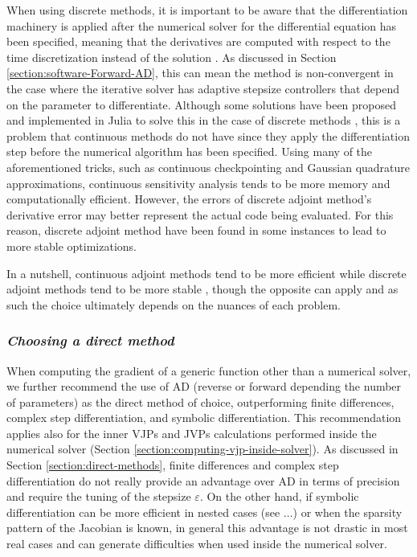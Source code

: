 When using discrete methods, it is important to be aware that the differentiation machinery is applied after the numerical solver for the differential equation has been specified, meaning that the derivatives are computed with respect to the time discretization instead of the solution \cite{Eberhard_Bischof_1996}.
As discussed in Section \ref{section:software-Forward-AD}, this can mean the method is non-convergent in the case where the iterative solver has adaptive stepsize controllers that depend on the parameter to differentiate.
Although some solutions have been proposed and implemented in Julia to solve this in the case of discrete methods \cite{Eberhard_Bischof_1996}, this is a problem that continuous methods do not have since they apply the differentiation step before the numerical algorithm has been specified. 
Using many of the aforementioned tricks, such as continuous checkpointing and Gaussian quadrature approximations, continuous sensitivity analysis tends to be more memory and computationally efficient. 
However, the errors of discrete adjoint method's derivative error may better represent the actual code being evaluated. 
For this reason, discrete adjoint method have been found in some instances to lead to more stable optimizations. 

In a nutshell, continuous adjoint methods tend to be more efficient while discrete adjoint methods tend to be more stable \cite{rackauckas2020universal}, though the opposite can apply and as such the choice ultimately depends on the nuances of each problem.

\subsubsection*{\textit{Choosing a direct method}}

When computing the gradient of a generic function other than a numerical solver, we further recommend the use of AD (reverse or forward depending the number of parameters) as the direct method of choice, outperforming finite differences, complex step differentiation, and symbolic differentiation. 
This recommendation applies also for the inner VJPs and JVPs calculations performed inside the numerical solver (Section \ref{section:computing-vjp-inside-solver}).
As discussed in Section \ref{section:direct-methods}, finite differences and complex step differentiation do not really provide an advantage over AD in terms of precision and require the tuning of the stepsize $\varepsilon$. 
On the other hand, if symbolic differentiation can be more efficient in nested cases (see ...) or when the sparsity pattern of the Jacobian is known, in general this advantage is not drastic in most real cases and can generate difficulties when used inside the numerical solver. 

